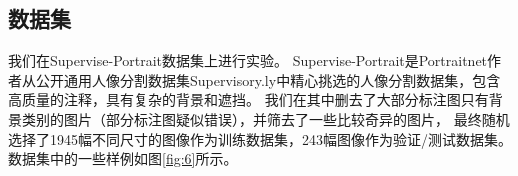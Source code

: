 \documentclass[11pt]{article}
\begin{document}
\subsection{数据集}
我们在Supervise-Portrait数据集上进行实验。
Supervise-Portrait是Portraitnet作者从公开通用人像分割数据集Supervisory.ly\cite{sur}中精心挑选的人像分割数据集，包含高质量的注释，具有复杂的背景和遮挡。
我们在其中删去了大部分标注图只有背景类别的图片（部分标注图疑似错误），并筛去了一些比较奇异的图片，
最终随机选择了1945幅不同尺寸的图像作为训练数据集，243幅图像作为验证/测试数据集。数据集中的一些样例如图\ref{fig:6}所示。
\begin{figure}[!h]
  \centering
\end{figure}
\end{document}
